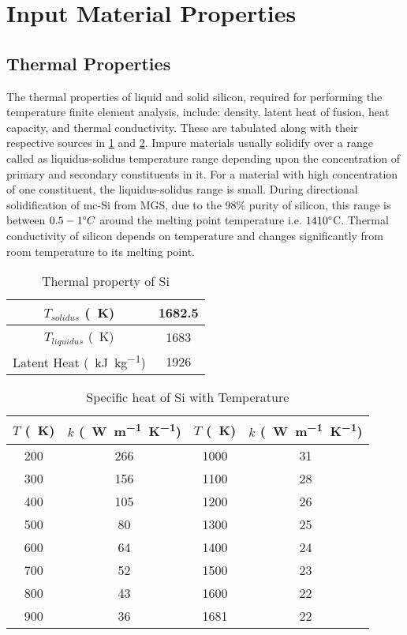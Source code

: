 \section{Input Material Properties}

\subsection{Thermal Properties}
The thermal properties of liquid and solid silicon, required for performing the temperature finite element analysis, include: density, latent heat of fusion, heat capacity, and thermal conductivity. These are tabulated along with their respective sources in \ref{table:thermal-prop-1} and \ref{table:thermal-prop-3}. Impure materials usually solidify over a range called as liquidus-solidus temperature range depending upon the concentration of primary and secondary constituents in it. For a material with high concentration of one constituent, the liquidus-solidus range is small. During directional solidification of mc-Si from MGS, due to the 98\% purity of silicon, this range is between $0.5-1\degree C$ around the melting point temperature i.e. $1410\degree$C. Thermal conductivity of silicon depends on temperature \cite{glassbrenner1964thermal} and changes significantly from room temperature to its melting point.

\begin{table}[h]
    \centering
    \begin{tabular}{|c|c|}
    \hline
    $T_{solidus}$ (\SI{}{K}) & 1682.5 \\ 
    \hline
    $T_{liquidus}$ (\SI{}{K}) & 1683 \\
    \hline
    Latent Heat (\SI{}{kJ.kg^{-1}}) & 1926 \\
    \hline
    \end{tabular}
    \caption{Thermal property of Si \cite{}}
    \label{table:thermal-prop-1}
\end{table}

\begin{table}[]
    \centering
    \begin{tabular}{ |c|c|c|c|}
    \hline
    $T$ (\SI{}{K}) & $k$ (\SI{}{W.m^{-1}.K^{-1}}) & $T$ (\SI{}{K}) & $k$ (\SI{}{W.m^{-1}.K^{-1}})  \\
    \hline
    200 & 266 & 1000 & 31 \\
    \hline
    300 & 156 & 1100 & 28 \\ 
    \hline
    400 & 105 & 1200 & 26 \\
    \hline
    500 & 80 & 1300 & 25 \\ 
    \hline
    600 & 64 & 1400 & 24 \\ 
    \hline
    700 & 52 & 1500 & 23 \\ 
    \hline
    800 & 43 & 1600 & 22 \\ 
    \hline
    900 & 36 & 1681 & 22 \\ 
    \hline
    \end{tabular}
    \caption{Specific heat of Si with Temperature \cite{}}
    \label{table:thermal-prop-3}
\end{table}


